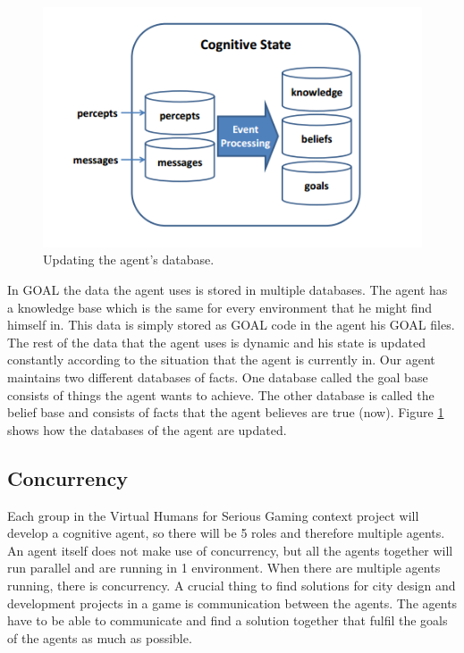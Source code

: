 \begin{figure}[h!]
  \includegraphics[width=\linewidth]{agentstate.png}
  \caption{Updating the agent's database.}
  \label{fig:agentstate1}
\end{figure}
In GOAL the data the agent uses is stored in multiple databases. The agent has a knowledge base which is the same for every environment that he might find himself in. This data is simply stored as GOAL code in the agent his GOAL files. The rest of the data that the agent uses is dynamic and his state is updated constantly according to the situation that the agent is currently in. Our agent maintains two different databases of facts. One database called the goal base consists of things the agent wants to achieve. The other database is called the belief base and consists of facts that the agent believes are true (now).  Figure \ref{fig:agentstate1} \cite{goal} shows how the databases of the agent are updated.



\newpage
\subsection{Concurrency}
Each group in the Virtual Humans for Serious Gaming context project will develop a cognitive agent, so there will be 5 roles and therefore multiple agents. An agent itself does not make use of concurrency, but all the agents together will run parallel and are running in 1 environment. When there are multiple agents running, there is concurrency. A crucial thing to find solutions for city design and development projects in a game is communication between the agents. The agents have to be able to communicate and find a solution together that fulfil the goals of the agents as much as possible.




